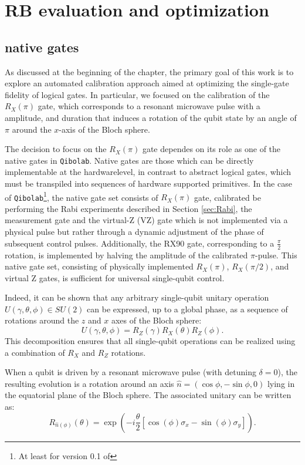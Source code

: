 \section{RB evaluation and optimization}

\subsection{\Qibolab native gates}
As discussed at the beginning of the chapter, the primary goal of this work is to explore an automated calibration approach aimed at optimizing the single-gate fidelity of logical gates. 
In particular, we focused on the calibration of the $R_X(\pi)$ gate, which corresponds to a resonant microwave pulse with a amplitude, and duration that induces a rotation of the qubit state by an angle of $\pi$ around the $x$-axis of the Bloch sphere.

The decision to focus on the $R_X(\pi)$ gate dependes on its role as one of the native gates in \texttt{Qibolab}. 
Native gates are those which can be directly implementable at the hardwarelevel, in contrast to abstract logical gates, which must be transpiled into sequences of hardware supported primitives. 
In the case of \texttt{Qibolab}\footnote{At least for version 0.1 of \Qibolab}, the native gate set consists of $R_X(\pi)$ gate, calibrated be performing the Rabi experiments described in Section \ref{sec:Rabi}, the measurement gate and the virtual-Z (VZ) gate which is not implemented via a physical pulse but rather through a dynamic adjustment of the phase of subsequent control pulses. 
Additionally, the RX90 gate, corresponding to a $\frac{\pi}{2}$ rotation, is implemented by halving the amplitude of the calibrated $\pi$-pulse.
This native gate set, consisting of physically implemented $R_X(\pi)$, $R_X(\pi/2)$, and virtual Z gates, is sufficient for universal single-qubit control.

Indeed, it can be shown that any arbitrary single-qubit unitary operation $ U(\gamma, \theta, \phi) \in SU(2) $ can be expressed, up to a global phase, as a sequence of rotations around the $z$ and $x$ axes of the Bloch sphere:
\begin{equation}
U(\gamma, \theta, \phi) = R_Z(\gamma) R_X(\theta) R_Z(\phi).
\end{equation}
This decomposition ensures that all single-qubit operations can be realized using a combination of $ R_X $ and $ R_Z $ rotations. 

When a qubit is driven by a resonant microwave pulse (with detuning $ \delta = 0 $), the resulting evolution is a rotation around an axis $\hat{n} = (\cos\phi, -\sin\phi, 0)$ lying in the equatorial plane of the Bloch sphere. 
The associated unitary can be written as:
\begin{equation}
R_{\hat{n}(\phi)}(\theta) = \exp\left( -i \frac{\theta}{2} \left[ \cos(\phi)\sigma_x - \sin(\phi)\sigma_y \right] \right).
\end{equation}

